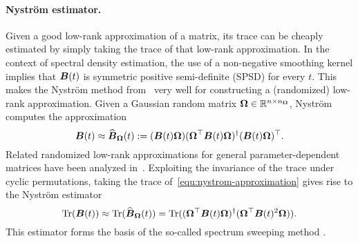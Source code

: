 \paragraph{Nyström estimator.} Given a good low-rank approximation of a matrix, its trace can be cheaply estimated by simply taking the trace of that low-rank approximation. In the context of  spectral density estimation, the use of a non-negative smoothing kernel implies that $\boldsymbol{B}(t)$ is symmetric positive semi-definite (SPSD) for every $t$. This makes the Nyström method
from~\cite{gittens-2013-revisiting-nystrom} very well for constructing a (randomized) low-rank approximation.
Given a Gaussian random matrix $\boldsymbol{\Omega} \in \mathbb{R}^{n \times n_{\boldsymbol{\Omega}}}$, Nyström computes the approximation
\begin{equation}
    \boldsymbol{B}(t) \approx \widehat{\boldsymbol{B}}_{\boldsymbol{\Omega}}(t) := (\boldsymbol{B}(t) \boldsymbol{\Omega}) (\boldsymbol{\Omega}^{\top} \boldsymbol{B}(t) \boldsymbol{\Omega})^{\dagger} (\boldsymbol{B}(t) \boldsymbol{\Omega})^{\top}.
    \label{equ:nystrom-approximation}
\end{equation}
Related randomized low-rank approximations for general parameter-dependent matrices have been analyzed in~\cite{kressner-2024-randomized-lowrank}.
Exploiting the invariance of the trace under cyclic permutations, taking the trace of~\eqref{equ:nystrom-approximation} gives rise to the Nyström estimator
\begin{equation}
    \operatorname{Tr}(\boldsymbol{B}(t)) \approx \operatorname{Tr}(\widehat{\boldsymbol{B}}_{\boldsymbol{\Omega}}(t)) = \operatorname{Tr}( (\boldsymbol{\Omega}^{\top} \boldsymbol{B}(t) \boldsymbol{\Omega})^{\dagger} ( \boldsymbol{\Omega}^{\top} \boldsymbol{B}(t)^2 \boldsymbol{\Omega})).
    \label{equ:nystrom-trace-estimator}
\end{equation}
This estimator forms the basis of the so-called spectrum sweeping method \cite{lin-2017-randomized-estimation}. 


%
%

